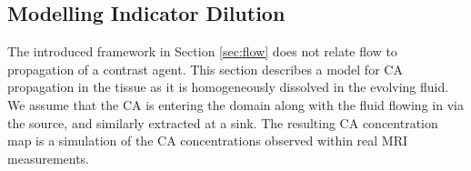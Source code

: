 \documentclass[journal,twocolumn]{IEEEtran}
\begin{document}
	

	
	
	
			
	\subsection{Modelling Indicator Dilution}\label{sec:transport}

	The introduced framework in Section \ref{sec:flow} does not relate flow to propagation of a contrast agent. This section describes a model for  CA propagation in the tissue as it is homogeneously dissolved in the evolving fluid.
	We assume that the CA is entering the domain along with the fluid flowing in via the source, and similarly extracted at a sink.
	The resulting CA concentration map is a simulation of the CA concentrations observed within real MRI measurements.
	
\end{document}
